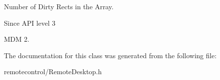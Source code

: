 \-Number of \-Dirty \-Rects in the \-Array. 

\begin{DoxySince}{\-Since}
\-A\-P\-I level 3 

\-M\-D\-M 2. 
\end{DoxySince}


\-The documentation for this class was generated from the following file\-:\begin{DoxyCompactItemize}
\item 
remotecontrol/\-Remote\-Desktop.\-h\end{DoxyCompactItemize}
